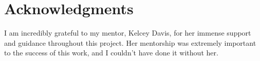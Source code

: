 \documentclass[twoside,twocolumn,12pt]{article}
\begin{document}
\section{Acknowledgments}
\fontsize{11}{13}\selectfont

{I am incredibly grateful to my mentor, Kelcey Davis, for her immense support and guidance throughout this project. Her mentorship was extremely important to the success of this work, and I couldn't have done it without her.
}


\onecolumn %

{}

\end{document}

